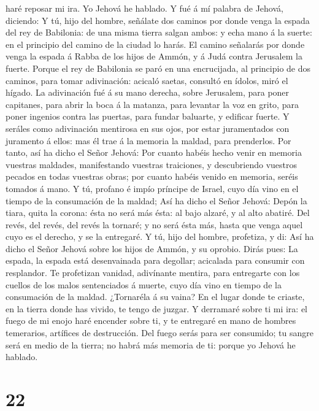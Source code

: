 haré reposar mi ira. Yo Jehová he hablado.  Y fué á mí
palabra de Jehová, diciendo:  Y tú, hijo del hombre,
señálate dos caminos por donde venga la espada del rey de Babilonia: de
una misma tierra salgan ambos: y echa mano á la suerte: en el principio
del camino de la ciudad lo harás.  El camino señalarás
por donde venga la espada á Rabba de los hijos de Ammón, y á Judá contra
Jerusalem la fuerte.  Porque el rey de Babilonia se paró
en una encrucijada, al principio de dos caminos, para tomar adivinación:
acicaló saetas, consultó en ídolos, miró el hígado.  La
adivinación fué á su mano derecha, sobre Jerusalem, para poner
capitanes, para abrir la boca á la matanza, para levantar la voz en
grito, para poner ingenios contra las puertas, para fundar baluarte, y
edificar fuerte.  Y seráles como adivinación mentirosa en
sus ojos, por estar juramentados con juramento á ellos: mas él trae á la
memoria la maldad, para prenderlos.  Por tanto, así ha
dicho el Señor Jehová: Por cuanto habéis hecho venir en memoria vuestras
maldades, manifestando vuestras traiciones, y descubriendo vuestros
pecados en todas vuestras obras; por cuanto habéis venido en memoria,
seréis tomados á mano.  Y tú, profano é impío príncipe de
Israel, cuyo día vino en el tiempo de la consumación de la maldad;
 Así ha dicho el Señor Jehová: Depón la tiara, quita la
corona: ésta no será más ésta: al bajo alzaré, y al alto abatiré.
 Del revés, del revés, del revés la tornaré; y no será
ésta más, hasta que venga aquel cuyo es el derecho, y se la entregaré.
 Y tú, hijo del hombre, profetiza, y di: Así ha dicho el
Señor Jehová sobre los hijos de Ammón, y su oprobio. Dirás pues: La
espada, la espada está desenvainada para degollar; acicalada para
consumir con resplandor.  Te profetizan vanidad,
adivínante mentira, para entregarte con los cuellos de los malos
sentenciados á muerte, cuyo día vino en tiempo de la consumación de la
maldad.  ¿Tornaréla á su vaina? En el lugar donde te
criaste, en la tierra donde has vivido, te tengo de juzgar.
 Y derramaré sobre ti mi ira: el fuego de mi enojo haré
encender sobre ti, y te entregaré en mano de hombres temerarios,
artífices de destrucción.  Del fuego serás para ser
consumido; tu sangre será en medio de la tierra; no habrá más memoria de
ti: porque yo Jehová he hablado.

\hypertarget{section-21}{%
\section{22}\label{section-21}}


